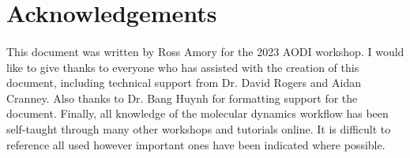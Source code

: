 \section{Acknowledgements}
\paragraph{}
    This document was written by Ross Amory for the 2023 AODI workshop. I would like to give thanks to everyone who has assisted with the creation of this document, including technical support from Dr. David Rogers and Aidan Cranney. Also thanks to Dr. Bang Huynh for formatting support for the document. Finally, all knowledge of the molecular dynamics workflow has been self-taught through many other workshops and tutorials online. It is difficult to reference all used however important ones have been indicated where possible. 